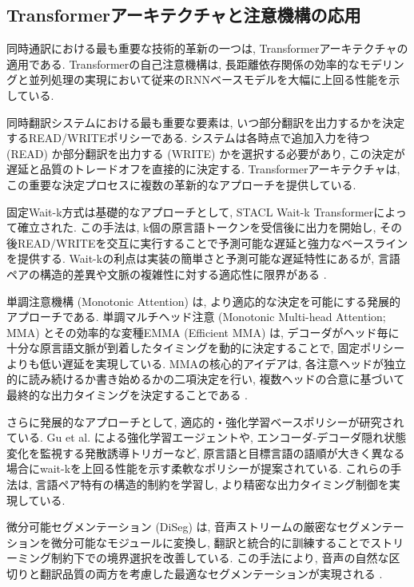 \subsection{Transformerアーキテクチャと注意機構の応用}

同時通訳における最も重要な技術的革新の一つは, Transformerアーキテクチャの適用である.
Transformerの自己注意機構は, 長距離依存関係の効率的なモデリングと並列処理の実現において従来のRNNベースモデルを大幅に上回る性能を示している.

同時翻訳システムにおける最も重要な要素は, いつ部分翻訳を出力するかを決定するREAD/WRITEポリシーである.
システムは各時点で追加入力を待つ (READ) か部分翻訳を出力する (WRITE) かを選択する必要があり, この決定が遅延と品質のトレードオフを直接的に決定する.
Transformerアーキテクチャは, この重要な決定プロセスに複数の革新的なアプローチを提供している.

固定Wait-k方式は基礎的なアプローチとして, STACL Wait-k Transformerによって確立された.
この手法は, k個の原言語トークンを受信後に出力を開始し, その後READ/WRITEを交互に実行することで予測可能な遅延と強力なベースラインを提供する.
Wait-kの利点は実装の簡単さと予測可能な遅延特性にあるが, 言語ペアの構造的差異や文脈の複雑性に対する適応性に限界がある \cite{ma2019stacl}.

単調注意機構 (Monotonic Attention) は, より適応的な決定を可能にする発展的アプローチである.
単調マルチヘッド注意 (Monotonic Multi-head Attention; MMA) とその効率的な変種EMMA (Efficient MMA) は, デコーダがヘッド毎に十分な原言語文脈が到着したタイミングを動的に決定することで, 固定ポリシーよりも低い遅延を実現している.
MMAの核心的アイデアは, 各注意ヘッドが独立的に読み続けるか書き始めるかの二項決定を行い, 複数ヘッドの合意に基づいて最終的な出力タイミングを決定することである \cite{ma2020monotonic,ma2023efficient}.

さらに発展的なアプローチとして, 適応的・強化学習ベースポリシーが研究されている.
Gu et al. \cite{gu2017learning} による強化学習エージェントや, エンコーダ-デコーダ隠れ状態変化を監視する発散誘導トリガーなど, 原言語と目標言語の語順が大きく異なる場合にwait-kを上回る性能を示す柔軟なポリシーが提案されている.
これらの手法は, 言語ペア特有の構造的制約を学習し, より精密な出力タイミング制御を実現している.

微分可能セグメンテーション (DiSeg) は, 音声ストリームの厳密なセグメンテーションを微分可能なモジュールに変換し, 翻訳と統合的に訓練することでストリーミング制約下での境界選択を改善している.
この手法により, 音声の自然な区切りと翻訳品質の両方を考慮した最適なセグメンテーションが実現される \cite{zhang2023diseg}.

